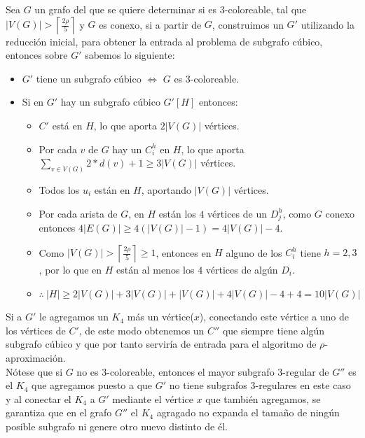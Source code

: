 \documentclass{article}
\begin{document}
Sea $G$ un grafo del que se quiere determinar si es $3$-coloreable, tal que $|V(G)| >  \left\lceil\frac{2\rho}{5} \right\rceil $ y $G$ es conexo, si a partir de $G$, construimos un $G'$ utilizando la 
reducci\'on inicial, para obtener la entrada al problema de subgrafo c\'ubico, entonces sobre $G'$ sabemos lo siguiente: 

\begin{itemize}
    \item $G'$ tiene un subgrafo c\'ubico $\Leftrightarrow $ $G$ es $3$-coloreable.
    \item Si en $G'$ hay un subgrafo c\'ubico $G'[H]$ entonces: 
    \begin{itemize}
        \item $C'$ est\'a en $H$, lo que aporta $2|V(G)|$ v\'ertices.
        \item Por cada $v$ de $G$ hay un $C_i^h$ en $H$, lo que aporta $\sum_{v \in V(G)} 2*d(v) + 1 \geq 3|V(G)|$ v\'ertices.
        \item Todos los $u_i$ est\'an en $H$, aportando $|V(G)|$ v\'ertices.
        \item Por cada arista de $G$, en $H$ est\'an los $4$ v\'ertices de un $D_j^h$, como $G$ conexo entonces $4|E(G)| \geq 4(|V(G)| - 1) = 4|V(G)|-4$.
        \item Como $|V(G)| > \left\lceil \frac{2 \rho}{5} \right\rceil \geq 1 $, entonces en $H$ alguno de los $C_i^h$ tiene $h =2,3$, por lo que en $H$ est\'an al menos los $4$ v\'ertices de alg\'un $D_i$.
        \item $\therefore~ |H| \geq 2|V(G)| + 3|V(G)| + |V(G)| + 4|V(G)|-4 +4 = 10|V(G)|$
    \end{itemize}
\end{itemize}
Si a $G'$ le agregamos un $K_4$ m\'as un v\'ertice($x$), conectando este v\'ertice a uno de los v\'ertices de $C'$, de este modo obtenemos un $C''$ que siempre tiene alg\'un subgrafo c\'ubico y que por tanto 
servir\'ia de entrada para el algoritmo de $\rho$-aproximaci\'on. \\

N\'otese que si $G$ no es $3$-coloreable, entonces el mayor subgrafo $3$-regular de $G''$ es el $K_4$ que agregamos puesto a que $G'$ no tiene 
subgrafos $3$-regulares en este caso y al conectar el $K_4$ a $G'$ mediante el v\'ertice $x$ que tambi\'en agregamos, se garantiza que en el grafo $G''$ el $K_4$
agragado no expanda el tama\~no de ning\'un posible subgrafo ni genere otro nuevo distinto de \'el.\\ 
\end{document}
